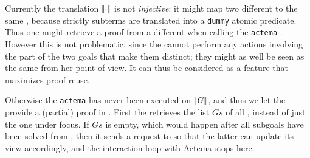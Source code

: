 \begin{remark}
  Currently the translation $\llbracket \cdot \rrbracket$ is not \emph{injective}: it might
  map two different   to the same  , because strictly
   subterms are translated into a \texttt{dummy} atomic predicate.
  Thus one might retrieve a proof from a different  when calling the
  \texttt{actema} . However this is not problematic, since the
   cannot perform any actions involving the part of the two goals
  that make them distinct; they might as well be seen as the same  from her
  point of view. It can thus be considered as a feature that maximizes proof
  reuse.
\end{remark}

Otherwise the \texttt{actema}  has never been executed on $\llbracket G \rrbracket$,
and thus we let the  provide a (partial) proof in . First
the  retrieves the list $Gs$ of all , instead of just
the one under focus. If $Gs$ is empty, which would happen after all subgoals
have been solved from , then it sends a  request to  so
that the latter can update its view accordingly, and the interaction loop with
Actema stops here.

